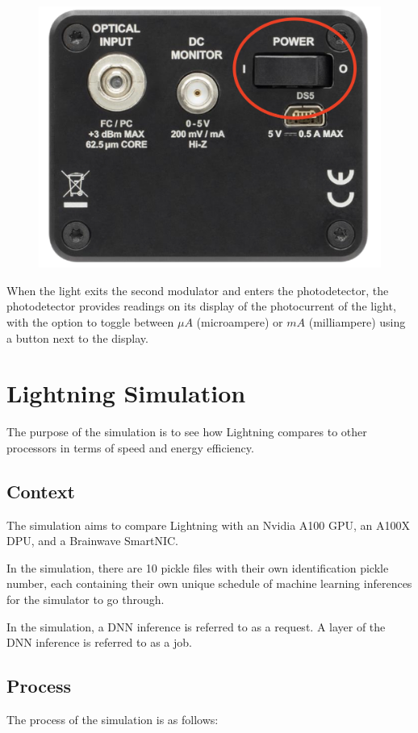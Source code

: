 \documentclass[11pt]{article}
\begin{document}
\begin{figure}[H]
    \centering
    \includegraphics[width=0.5\linewidth]{pdonoff.png}
    \label{fig:enter-label}
\end{figure}

When the light exits the second modulator and enters the photodetector, the photodetector provides readings on its display of the photocurrent of the light, with the option to toggle between $\mu A$ (microampere) or $mA$ (milliampere) using a button next to the display.

\section{Lightning Simulation}

The purpose of the simulation is to see how Lightning compares to other processors in terms of speed and energy efficiency.

\subsection{Context}

The simulation aims to compare Lightning with an Nvidia A100 GPU, an A100X DPU, and a Brainwave SmartNIC.

In the simulation, there are 10 pickle files with their own identification pickle number, each containing their own unique schedule of machine learning inferences for the simulator to go through.

In the simulation, a DNN inference is referred to as a request. A layer of the DNN inference is referred to as a job. 

\subsection{Process}
The process of the simulation is as follows:
\end{document}
